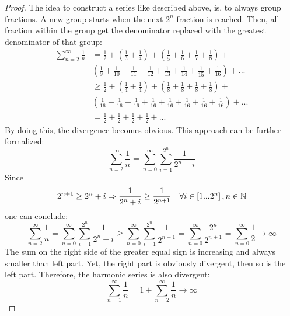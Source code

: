 \begin{proof}
    The idea to construct a series like described above, is, to always group fractions.
    A new group starts when the next $2^n$ fraction is reached.
    Then, all fraction within the group get the denominator replaced with the greatest denominator 
    of that group:
    \begin{equation}
        \begin{split}
            \sum_{n=2}^{\infty}\frac{1}{n} & = 
            \frac{1}{2}
            + \left(\frac{1}{3} + \frac{1}{4}\right) 
            + \left(\frac{1}{5} + \frac{1}{6} + \frac{1}{7} + \frac{1}{8}\right) + \\
            & \left(\frac{1}{9} + \frac{1}{10} + \frac{1}{11} + \frac{1}{12} + \frac{1}{13} + 
            \frac{1}{14} + \frac{1}{15} + \frac{1}{16}\right) + ... \\
            & \ge \frac{1}{2} 
                  + \left(\frac{1}{4} + \frac{1}{4}\right)
                  + \left(\frac{1}{8} + \frac{1}{8} + \frac{1}{8} + \frac{1}{8}\right) + \\
            &     \left(\frac{1}{16} + \frac{1}{16} + \frac{1}{16} + \frac{1}{16} + \frac{1}{16} + 
                          \frac{1}{16} + \frac{1}{16} + \frac{1}{16}\right) + ... \\
            & = \frac{1}{2} + \frac{1}{2} + \frac{1}{2} + \frac{1}{2} + ...
        \end{split}
    \end{equation}
    By doing this, the divergence becomes obvious. This approach can be further formalized:
    \begin{equation}
        \sum_{n=2}^{\infty}\frac{1}{n} = \sum_{n=0}^{\infty}\sum_{i=1}^{2^n}\frac{1}{2^n+i}
    \end{equation}
    Since 
    \begin{equation}
        2^{n+1} \ge 2^n+i \Rightarrow \frac{1}{2^n+i} \ge \frac{1}{2^{n+1}} \quad \forall i \in \left[1...2^n\right], n \in \mathbb{N}
    \end{equation}
    one can conclude:
    \begin{equation}
        \sum_{n=2}^{\infty}\frac{1}{n} = \sum_{n=0}^{\infty}\sum_{i=1}^{2^n}\frac{1}{2^n+i}
            \ge \sum_{n=0}^{\infty}\sum_{i=1}^{2^n}\frac{1}{2^{n+1}}
            = \sum_{n=0}^{\infty}\frac{2^n}{2^{n+1}} = \sum_{n=0}^{\infty}\frac{1}{2} \to \infty
    \end{equation}
    The sum on the right side of the greater equal sign is increasing and always smaller than 
    left part.
    Yet, the right part is obviously divergent, then so is the left part.
    Therefore, the harmonic series is also divergent:
    \begin{equation}
        \sum_{n=1}^{\infty}\frac{1}{n} = 1 + \sum_{n=2}^{\infty}\frac{1}{n} \to \infty
    \end{equation}
\end{proof}

